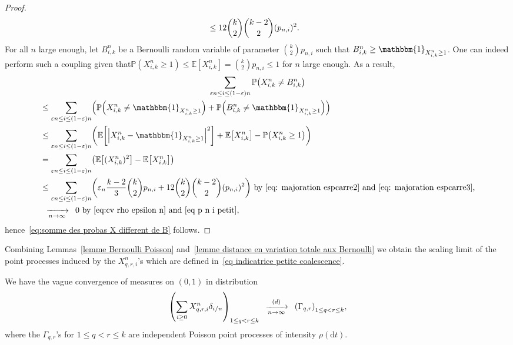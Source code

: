 \documentclass[10pt]{amsart}
\theoremstyle{definition}\newtheorem{defi}[theo]{Definition}\newtheorem{rema}[theo]{Remark}\newtheorem{exam}[theo]{Example}\newtheorem{exem}[theo]{Example}\newtheorem{nota}[theo]{Notation}
\newcommand{\e}{\varepsilon}
\newcommand{\cv}[1][n]{\enskip\xrightarrow[#1 \to \infty]{}\enskip}
\newcommand{\cvloi}[1][n]{\enskip\xrightarrow[#1 \to \infty]{(d)}\enskip}
\newcommand{\rmd}{\mathrm{d}}
\renewcommand{\P}{{\mathbb{P}}}
\newcommand{\E}{\mathbb{E}}
\newcommand{\1}{\mathbbm{1}}
\let\originalleft\left
\let\originalright\right
\renewcommand{\left}{\mathopen{}\mathclose\bgroup\originalleft}
\renewcommand{\right}{\aftergroup\egroup\originalright}
\renewcommand*{\to}{\mathchoice{\longrightarrow}{\rightarrow}{\rightarrow}{\rightarrow}}
\begin{document}
\begin{proof}
\begin{align}
&\le 12\binom{k}{2}\binom{k-2}{2} (p_{n,i})^2. \notag
\end{align}
\endgroup
For all $n$ large enough, let $B^n_{i,k}$ be a Bernoulli random variable of parameter $\binom{k}{2} p_{n,i}$ such that $B^n_{i,k}\ge \1_{X^n_{i,k}\ge 1}$. One can indeed perform such a coupling given that\linebreak $\P(X^n_{i,k}\ge 1) \le \E[X^n_{i,k}]=\binom{k}{2} p_{n,i} \le 1$ for $n$ large enough. As a result,
\begin{multline*}
\sum_{\e n \le i \le (1-\e) n } \P\left(X^n_{i,k} \neq B^n_{i,k}\right)\\
\begin{aligned}
&\le \sum_{\e n \le i \le (1-\e) n } \left(\P\left(X^n_{i,k} \neq \1_{X^n_{i,k}\ge 1}\right) +
\P\left(B^n_{i,k} \neq \1_{X^n_{i,k}\ge 1}\right)
\right)\\
&\le \sum_{\e n \le i \le (1-\e) n } \left(
\E\left[
\left| X^n_{i,k} - \1_{X^n_{i,k}\ge 1}
\right|^2
\right] +\E\left[X^n_{i,k}
\right] -\P\left(X^n_{i,k}\ge1\right)
\right)
\\
&= \sum_{\e n \le i \le (1-\e) n } \left(
\E\left[(X^n_{i,k})^2\right] -\E\left[X^n_{i,k}
\right]
\right) \\
&\le
\sum_{\e n \le i \le (1-\e) n } \left(
\e_n \frac{k-2}{3} \binom{k}{2} p_{n,i} + 12 \binom{k}{2}\binom{k-2}{2} (p_{n,i})^2
\right) \text{ by~\eqref{eq: majoration espcarre2} and~\eqref{eq: majoration espcarre3},}
\\
&\cv[n] 0 \text{ by~\eqref{eq:cv rho epsilon n} and~\eqref{eq p n i petit}},
\end{aligned}
\end{multline*}
hence~\eqref{eq:somme des probas X different de B} {follows}.
\end{proof}

Combining Lemmas~\ref{lemme Bernoulli Poisson} and~\ref{lemme distance en variation totale aux Bernoulli} we obtain the scaling limit of the point processes induced by the $X^n_{q,r,i}$'s which are defined in~\eqref{eq indicatrice petite coalescence}.

\begin{coro}\label{cor: cv petites coalescences}
We have the {vague} convergence of measures on $(0,1)$ in distribution
\[
\left(\sum_{i\ge 0} X^n_{q,r,i} \delta_{i/n} \right)_{1 \le q<r \le k}
\cvloi[n]
\left(\Gamma_{q,r}\right)_{1 \le q<r \le k},
\]
where the $\Gamma_{q,r}$'s for $1 \le q<r\le k$ are independent Poisson point processes of intensity $\rho(\rmd t)$.
\end{coro}
\end{document}
